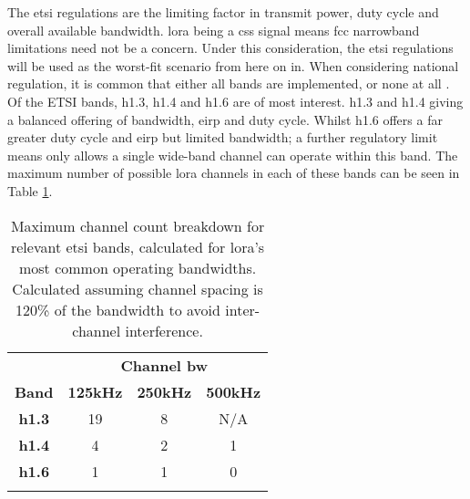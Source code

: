 The \ac{etsi} regulations are the limiting factor in transmit power, duty cycle and overall available bandwidth. \ac{lora} being a \ac{css} signal means \ac{fcc} narrowband limitations need not be a concern. Under this consideration, the \ac{etsi} regulations will be used as the worst-fit scenario from here on in. When considering national regulation, it is common that either all bands are implemented, or none at all \cite{3YP:CEPT_ERC_REC}. Of the ETSI bands, h1.3, h1.4 and h1.6 are of most interest. h1.3 and h1.4 giving a balanced offering of bandwidth, \ac{eirp} and duty cycle. Whilst h1.6 offers a far greater duty cycle and \ac{eirp} but limited bandwidth; a further regulatory limit means only allows a single wide-band channel can operate within this band. The maximum number of possible \ac{lora} channels in each of these bands can be seen in Table \ref{tab:ETSILoraChannels}.

\begin{table}[H]
\centering\small
\caption[Maximum channel breakdown for \ac{lora}]{Maximum channel count breakdown for relevant \ac{etsi} bands, calculated for \ac{lora}'s most common operating bandwidths. Calculated assuming channel spacing is 120\%  of the bandwidth to avoid inter-channel interference.}
\label{tab:ETSILoraChannels}
\renewcommand*{\arraystretch}{1.1}
\begin{tabular}{c|ccc}
    \toprule
    & \multicolumn{3}{c}{\textbf{Channel \ac{bw}}}	\\
    \textbf{Band} & \textbf{125kHz} & \textbf{250kHz} & \textbf{500kHz}\\
    \midrule\addlinespace
    \textbf{h1.3} & 19 & 8 & N/A \\
    \textbf{h1.4} & 4 & 2 & 1 \\
    \textbf{h1.6} & 1 & 1 & 0 \\
    \addlinespace\bottomrule
\end{tabular}
\end{table}
